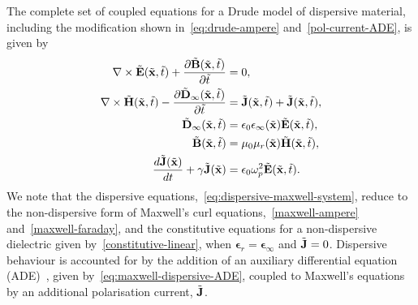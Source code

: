 The complete set of coupled equations for a Drude model of dispersive material, including the modification shown in~\eqref{eq:drude-ampere} and~\eqref{pol-current-ADE}, is given by
\begin{subequations}
    \label{eq:dispersive-maxwell-system}
    \begin{align}
        \nabla \times \tilde{\mathbf{E}}(\tilde{\mathbf{x}},\tilde{t}) + \frac{\partial \tilde{\mathbf{B}}(\tilde{\mathbf{x}}, \tilde{t})}{\partial \tilde{t}}&= 0, \\
        \nabla \times \tilde{\mathbf{H}}(\tilde{\mathbf{x}},\tilde{t}) - \frac{\partial \tilde{\mathbf{D}}_{\infty}(\tilde{\mathbf{x}}, \tilde{t}) }{\partial \tilde{t}}&= \tilde{\mathbf{J}}(\tilde{\mathbf{x}},\tilde{t}) + \tilde{\mathbf{J}}(\tilde{\mathbf{x}},\tilde{t}), \\
        \tilde{\mathbf{D}}_{\infty}(\tilde{\mathbf{x}},\tilde{t}) &= \epsilon_0 \epsilon_{\infty}(\tilde{\mathbf{x}}) \tilde{\mathbf{E}}(\tilde{\mathbf{x}},\tilde{t}), \\
        \tilde{\mathbf{B}}(\tilde{\mathbf{x}},\tilde{t}) &= \mu_0 \mu_r(\tilde{\mathbf{x}}) \tilde{\mathbf{H}}(\tilde{\mathbf{x}},\tilde{t}), \\
        \frac{d \tilde{\mathbf{J}}(\tilde{\mathbf{x}})}{dt} + \gamma \tilde{\mathbf{J}}(\tilde{\mathbf{x}}) &= \epsilon_0 \omega_p^2 \tilde{\mathbf{E}}(\tilde{\mathbf{x}}, \tilde{t}) . \label{eq:maxwell-dispersive-ADE}
    \end{align}
\end{subequations}
%
We note that the dispersive equations,~\eqref{eq:dispersive-maxwell-system}, reduce to the non-dispersive form of Maxwell's curl equations,~\eqref{maxwell-ampere} and~\eqref{maxwell-faraday}, and the constitutive equations for a non-dispersive dielectric given by~\eqref{constitutive-linear}, when $\mathbf{\epsilon}_r = \mathbf{\epsilon}_{\infty}$ and $\tilde{\mathbf{J}} = 0$. Dispersive behaviour is accounted for by the addition of an auxiliary differential equation (ADE)~\cite{Taflove:1989ds,Niegemann:2009uv,Ji:2007dl}, given by~\eqref{eq:maxwell-dispersive-ADE}, coupled to Maxwell's equations by an additional polarisation current, $\tilde{\mathbf{J}}$.


